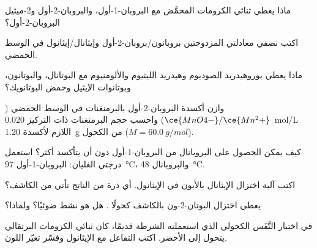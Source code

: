 \begin{exercise}[$\star$]\label{exo:b1:organic-redox:2}
ماذا يعطي ثنائي الكرومات المحمَّض مع البروبان-1-أول، والبروبان-2-أول
و2-ميثيل البروبان-2-أول؟
\end{exercise}

\begin{exercise}[$\star$]\label{exo:b1:organic-redox:3}
اكتب نصفي معادلتي المزدوجتين بروبانون/بروبان-2-أول
وإيثانال/إيثانول في الوسط الحمضي.
\end{exercise}

\begin{exercise}[$\star$]\label{exo:b1:organic-redox:4}
ماذا يعطي بوروهيدريد الصوديوم وهيدريد الليثيوم والألومنيوم مع
البوتانال، والبوتانون، وبوتانوات الإيثيل وحمض البوتانويك؟
\end{exercise}

\begin{exercise}[$\star\star$]\label{exo:b1:organic-redox:5}
وازن أكسدة البروبان-2-أول بالبرمنغنات في الوسط الحمضي
($\ce{MnO4-}/\ce{Mn^2+}$) واحسب حجم البرمنغنات ذات التركيز
\qty{0.020}{mol/L} اللازم لأكسدة \qty{1.20}{g} من الكحول ($M = \qty{60.0}{g/mol}$).
\end{exercise}

\begin{exercise}[$\star\star$]\label{exo:b1:organic-redox:6}
كيف يمكن الحصول على البروبانال من البروبان-1-أول دون أن يتأكسد
أكثر؟ استعمل درجتي الغليان: البروبان-1-أول \qty{97}{\celsius}، والبروبانال
\qty{48}{\celsius}.
\end{exercise}

\begin{exercise}[$\star\star$]\label{exo:b1:organic-redox:7}
اكتب آلية اختزال الإيثانال بالأيون  في الإيثانول.
أي ذرة من الناتج تأتي من الكاشف؟
\end{exercise}

\begin{exercise}[$\star\star$]\label{exo:b1:organic-redox:8}
يعطي اختزال البوتان-2-ون بالكاشف  كحولًا . هل هو
نشط ضوئيًا؟ ولماذا؟
\end{exercise}

\begin{exercise}[$\star\star$]\label{exo:b1:organic-redox:9}
في اختبار النَّفَس الكحولي الذي استعملته الشرطة قديمًا، كان ثنائي الكرومات البرتقالي
يتحول إلى الأخضر. اكتب التفاعل مع الإيثانول وفسّر تغيّر
اللون.
\end{exercise}


